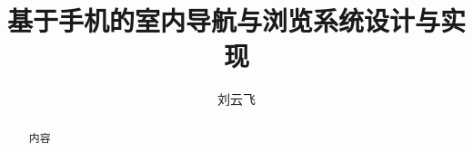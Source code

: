 \documentclass[UTF8]{ctexart}
\author{刘云飞}
\title{基于手机的室内导航与浏览系统设计与实现}
\begin{document}
\maketitle

\begin{abstract}
    内容
\end{abstract}

\tableofcontents

    
    
    
    
    
    
    
\end{document}
